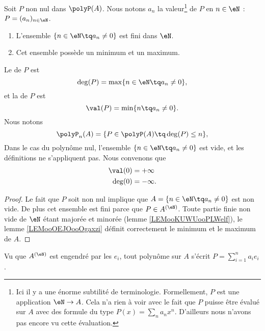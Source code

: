 \begin{propositionDef}  \label{DefDegrePoly}
	Soit \( P\) non nul dans \(\polyP(A)\). Nous notons \( a_n\) la valeur\footnote{Ici il y a une énorme subtilité de terminologie. Formellement, \( P\) est une application \( \eN\to A\). Cela n'a rien à voir avec le fait que \( P\) puisse être évalué sur \( A\) avec des formule du type \( P(x)=\sum_na_nx^n\). D'ailleurs nous n'avons pas encore vu cette évaluation.} de \( P\) en \( n\in \eN\) : \( P=(a_n)_{n\in \eN}\).
	\begin{enumerate}
		\item
		      L'ensemble \( \{ n\in \eN\tq a_n\neq 0 \}\) est fini dans \( \eN\).
		\item
		      Cet ensemble possède un minimum et un maximum.
	\end{enumerate}
	Le  de \( P\) est
	\begin{equation}
		\deg(P)=\max\{ n\in \eN\tq a_n\neq 0 \},
	\end{equation}
	et la  de \( P\) est
	\begin{equation}
		\val(P)=\min\{ n\tq a_n\neq 0 \}.
	\end{equation}
	Nous notons
	\begin{equation}		\label{EQooAULWooDgogWT}
		\polyP_n(A)=\{ P\in \polyP(A)\tq \deg(P)\leq n \},
	\end{equation}
	Dans le cas du polynôme nul, l'ensemble \( \{ n\in \eN\tq a_n\neq 0 \}\) est vide, et les définitions ne s'appliquent pas. Nous convenons que
	\begin{subequations}
		\begin{align}
			\val(0) & =+\infty  \\
			\deg(0) & =-\infty.
		\end{align}
	\end{subequations}
\end{propositionDef}

\begin{proof}
	Le fait que \( P\) soit non nul implique que \( A=\{ n\in \eN\tq a_n\neq 0 \}\) est non vide. De plus cet ensemble est fini parce que \( P\in A^{(\eN)}\). Toute partie finie non vide de \( \eN\) étant majorée et minorée (lemme \ref{LEMooKUWUooPLWelf}), le lemme \ref{LEMooOEJOooOgaxzi} définit correctement le minimum et le maximum de \( A\).
\end{proof}

Vu que \( A^{(\eN)}\) est engendré par les \( e_i\), tout polynôme sur \( A\) s'écrit \( P=\sum_{i=1}^na_ie_i\).

